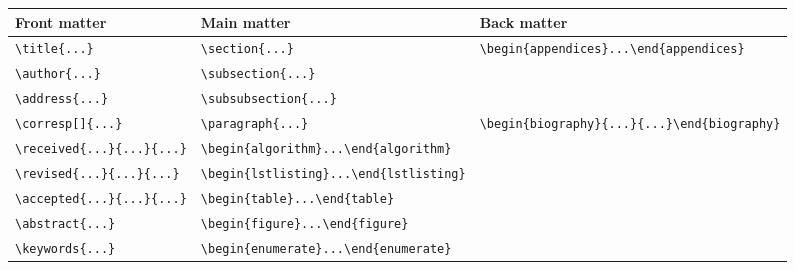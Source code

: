 \documentclass{article}
\begin{document}
\begin{center}\fontsize{6}{9}\selectfont\begin{tabular}{|l|l|l|}\hline
\textbf{Front matter}&   \textbf{Main matter}&    \textbf{Back matter}\\
\hline
\verb+\title{...}+&     \verb+\section{...}+&   \verb+\begin{appendices}...\end{appendices}+\\\hline
\verb+\author{...}+&    \verb+\subsection{...}+&        \verb++\\\hline
\verb+\address{...}+&  \verb+\subsubsection{...}+&     \verb++\\\hline
\verb+\corresp[]{...}+&   \verb+\paragraph{...}+& \verb+\begin{biography}{...}{...}\end{biography}+\\\hline
\verb+\received{...}{...}{...}+&   \verb+\begin{algorithm}...\end{algorithm}+&     \\\hline
\verb+\revised{...}{...}{...}+&    \verb+\begin{lstlisting}...\end{lstlisting}+&      \\\hline
\verb+\accepted{...}{...}{...}+&     \verb+\begin{table}...\end{table}+&      \\\hline
\verb+\abstract{...}+&    \verb+\begin{figure}...\end{figure}+&    \\\hline
\verb+\keywords{...}+&  \verb+\begin{enumerate}...\end{enumerate}+&      \\\hline

\end{tabular}
\end{center}
\end{document}
